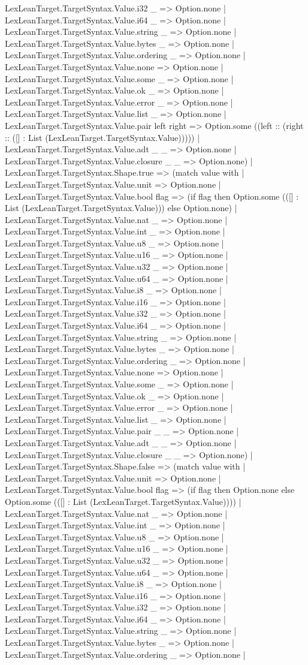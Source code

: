 \documentclass[11pt]{article}
\begin{document}
LexLeanTarget.TargetSyntax.Value.i32 \_ => Option.none | LexLeanTarget.TargetSyntax.Value.i64 \_ => Option.none | LexLeanTarget.TargetSyntax.Value.string \_ => Option.none | LexLeanTarget.TargetSyntax.Value.bytes \_ => Option.none | LexLeanTarget.TargetSyntax.Value.ordering \_ => Option.none | LexLeanTarget.TargetSyntax.Value.none => Option.none | LexLeanTarget.TargetSyntax.Value.some \_ => Option.none | LexLeanTarget.TargetSyntax.Value.ok \_ => Option.none | LexLeanTarget.TargetSyntax.Value.error \_ => Option.none | LexLeanTarget.TargetSyntax.Value.list \_ => Option.none | LexLeanTarget.TargetSyntax.Value.pair left right => Option.some ((left :: (right :: ([] : List (LexLeanTarget.TargetSyntax.Value))))) | LexLeanTarget.TargetSyntax.Value.adt \_ \_ => Option.none | LexLeanTarget.TargetSyntax.Value.closure \_ \_ => Option.none) | LexLeanTarget.TargetSyntax.Shape.true => (match value with | LexLeanTarget.TargetSyntax.Value.unit => Option.none | LexLeanTarget.TargetSyntax.Value.bool flag => (if flag then Option.some (([] : List (LexLeanTarget.TargetSyntax.Value))) else Option.none) | LexLeanTarget.TargetSyntax.Value.nat \_ => Option.none | LexLeanTarget.TargetSyntax.Value.int \_ => Option.none | LexLeanTarget.TargetSyntax.Value.u8 \_ => Option.none | LexLeanTarget.TargetSyntax.Value.u16 \_ => Option.none | LexLeanTarget.TargetSyntax.Value.u32 \_ => Option.none | LexLeanTarget.TargetSyntax.Value.u64 \_ => Option.none | LexLeanTarget.TargetSyntax.Value.i8 \_ => Option.none | LexLeanTarget.TargetSyntax.Value.i16 \_ => Option.none | LexLeanTarget.TargetSyntax.Value.i32 \_ => Option.none | LexLeanTarget.TargetSyntax.Value.i64 \_ => Option.none | LexLeanTarget.TargetSyntax.Value.string \_ => Option.none | LexLeanTarget.TargetSyntax.Value.bytes \_ => Option.none | LexLeanTarget.TargetSyntax.Value.ordering \_ => Option.none | LexLeanTarget.TargetSyntax.Value.none => Option.none | LexLeanTarget.TargetSyntax.Value.some \_ => Option.none | LexLeanTarget.TargetSyntax.Value.ok \_ => Option.none | LexLeanTarget.TargetSyntax.Value.error \_ => Option.none | LexLeanTarget.TargetSyntax.Value.list \_ => Option.none | LexLeanTarget.TargetSyntax.Value.pair \_ \_ => Option.none | LexLeanTarget.TargetSyntax.Value.adt \_ \_ => Option.none | LexLeanTarget.TargetSyntax.Value.closure \_ \_ => Option.none) | LexLeanTarget.TargetSyntax.Shape.false => (match value with | LexLeanTarget.TargetSyntax.Value.unit => Option.none | LexLeanTarget.TargetSyntax.Value.bool flag => (if flag then Option.none else Option.some (([] : List (LexLeanTarget.TargetSyntax.Value)))) | LexLeanTarget.TargetSyntax.Value.nat \_ => Option.none | LexLeanTarget.TargetSyntax.Value.int \_ => Option.none | LexLeanTarget.TargetSyntax.Value.u8 \_ => Option.none | LexLeanTarget.TargetSyntax.Value.u16 \_ => Option.none | LexLeanTarget.TargetSyntax.Value.u32 \_ => Option.none | LexLeanTarget.TargetSyntax.Value.u64 \_ => Option.none | LexLeanTarget.TargetSyntax.Value.i8 \_ => Option.none | LexLeanTarget.TargetSyntax.Value.i16 \_ => Option.none | LexLeanTarget.TargetSyntax.Value.i32 \_ => Option.none | LexLeanTarget.TargetSyntax.Value.i64 \_ => Option.none | LexLeanTarget.TargetSyntax.Value.string \_ => Option.none | LexLeanTarget.TargetSyntax.Value.bytes \_ => Option.none | LexLeanTarget.TargetSyntax.Value.ordering \_ => Option.none | 
\end{document}
